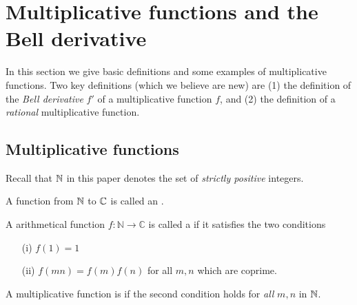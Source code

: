 
\section{Multiplicative functions and the Bell derivative}

In this section we give basic definitions and some examples of multiplicative functions. Two key definitions (which we believe are new) are (1) the definition of the \emph{Bell derivative} $f'$ of a multiplicative function $f$, and (2) the definition of  a \emph{rational} multiplicative function.

\subsection{Multiplicative functions}

Recall that $\mathbb{N}$ in this paper denotes the set of \emph{strictly positive} integers.

\begin{definition}
A function from $\mathbb{N}$ to $\mathbb{C}$ is called an .
\end{definition}

\begin{definition} \label{def:multiplicative}
A arithmetical function $f: \mathbb{N} \to \mathbb{C}$ is called a  if it satisfies the two conditions
\begin{itemize}
\item[(i)] $f(1) = 1$
\item[(ii)] $f(mn) = f(m) f(n)$ for all $m, n$ which are coprime.
\end{itemize}
A multiplicative function is  if the second condition holds for \emph{all} $m, n$ in $\mathbb{N}$. 

\end{definition}



